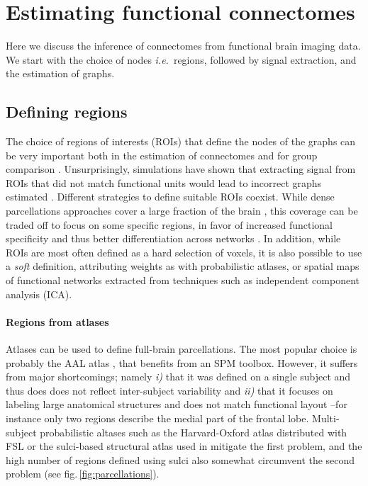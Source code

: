 \documentclass[5p]{elsarticle}
\begin{document}

\section{Estimating functional connectomes}

Here we discuss the inference of connectomes from functional brain
imaging data. We start with the choice of nodes \emph{i.e.}\ regions,
followed by signal extraction, and the estimation of graphs.

\subsection{Defining regions}

The choice of regions of interests (ROIs) that define the nodes of the
graphs can be very important both in the estimation of connectomes and
for group comparison \cite{wang2009}. Unsurprisingly, simulations have
shown that extracting signal from ROIs that did not match functional
units would lead to incorrect graphs estimated \cite{smith2011}.
%
Different strategies to define suitable ROIs coexist. While dense parcellations approaches cover
a large fraction of the brain \cite{achard2006, varoquaux2010c,
wang2009}, this coverage can be traded off to focus on some specific
regions, in favor of increased functional specificity and thus better
differentiation across networks \cite{greicius2003, fair2009,
varoquaux2010b}. In addition, while
ROIs are most often defined as a hard selection of voxels, it is also
possible to use a \emph{soft} definition, attributing weights as with
probabilistic atlases, or spatial maps of functional networks extracted
from techniques such as independent component analysis (ICA).


\paragraph{Regions from atlases}
%
Atlases can be used to define full-brain parcellations. The most popular
choice is probably the AAL atlas \cite{tzourio-mazoyer2002a}, that
benefits from an SPM toolbox. However, it suffers from major
shortcomings; namely \emph{i)} that it was defined on a single subject
and thus does does not reflect inter-subject variability and \emph{ii)}
that it focuses on labeling large anatomical structures and does not match
functional layout --for instance only two regions describe the medial
part of the frontal lobe. Multi-subject probabilistic altases such as the
Harvard-Oxford atlas distributed with FSL \cite{smith2004} or the
sulci-based structural atlas used in \cite{varoquaux2010c} mitigate the
first problem, and the high number of regions defined using sulci also
somewhat circumvent the second problem (see
fig.\,\ref{fig:parcellations}).
\end{document}
